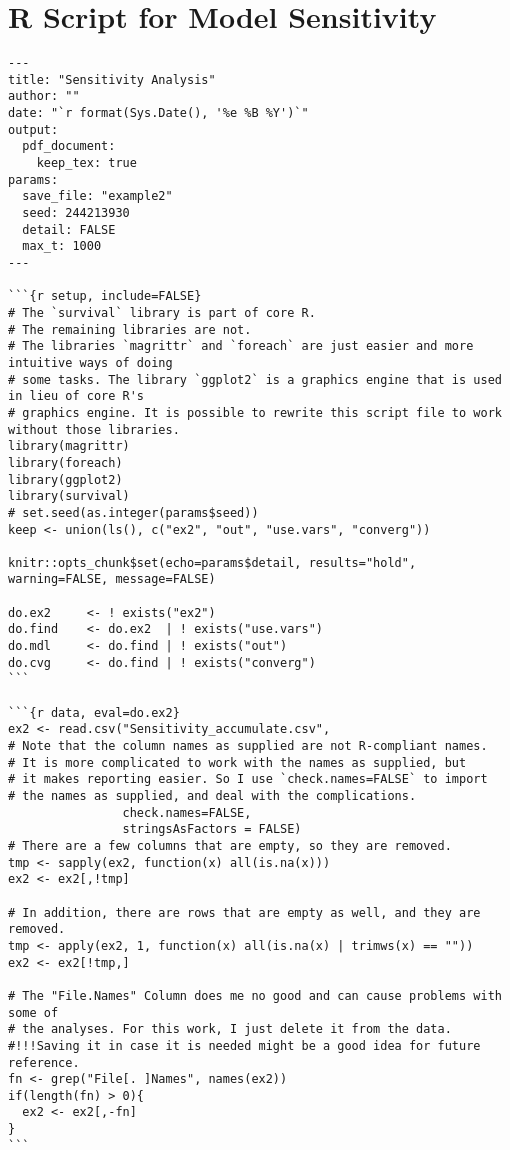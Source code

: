 \section{R Script for Model Sensitivity}
\label{rscript-sensitivity}
\vspace{\baselineskip}
\begin{lstlisting}[basicstyle=\scriptsize]
---
title: "Sensitivity Analysis"
author: ""
date: "`r format(Sys.Date(), '%e %B %Y')`"
output:
  pdf_document:
    keep_tex: true
params:
  save_file: "example2"
  seed: 244213930
  detail: FALSE
  max_t: 1000
---

```{r setup, include=FALSE}
# The `survival` library is part of core R.
# The remaining libraries are not.
# The libraries `magrittr` and `foreach` are just easier and more intuitive ways of doing
# some tasks. The library `ggplot2` is a graphics engine that is used in lieu of core R's
# graphics engine. It is possible to rewrite this script file to work without those libraries.
library(magrittr)
library(foreach)
library(ggplot2)
library(survival)
# set.seed(as.integer(params$seed))
keep <- union(ls(), c("ex2", "out", "use.vars", "converg"))

knitr::opts_chunk$set(echo=params$detail, results="hold", warning=FALSE, message=FALSE)

do.ex2     <- ! exists("ex2")
do.find    <- do.ex2  | ! exists("use.vars")
do.mdl     <- do.find | ! exists("out")
do.cvg     <- do.find | ! exists("converg")
```

```{r data, eval=do.ex2}
ex2 <- read.csv("Sensitivity_accumulate.csv",
# Note that the column names as supplied are not R-compliant names.
# It is more complicated to work with the names as supplied, but
# it makes reporting easier. So I use `check.names=FALSE` to import
# the names as supplied, and deal with the complications.
                check.names=FALSE,
                stringsAsFactors = FALSE)
# There are a few columns that are empty, so they are removed.
tmp <- sapply(ex2, function(x) all(is.na(x)))
ex2 <- ex2[,!tmp]

# In addition, there are rows that are empty as well, and they are removed.
tmp <- apply(ex2, 1, function(x) all(is.na(x) | trimws(x) == ""))
ex2 <- ex2[!tmp,]

# The "File.Names" Column does me no good and can cause problems with some of
# the analyses. For this work, I just delete it from the data.
#!!!Saving it in case it is needed might be a good idea for future reference.
fn <- grep("File[. ]Names", names(ex2))
if(length(fn) > 0){
  ex2 <- ex2[,-fn]
}
```


\end{lstlisting}
